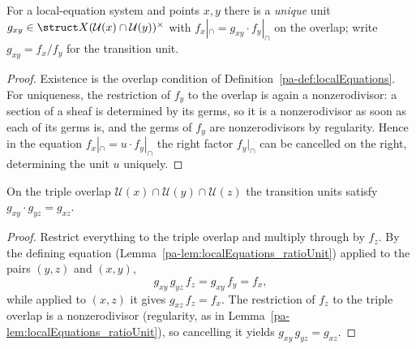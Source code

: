 \begin{lemma}
  \label{pa-lem:localEquations_ratioUnit}
  \leanok

  For a local-equation system and points \(x, y\) there is a \emph{unique} unit \(g_{xy} \in
  \struct X(\mathcal U(x) \cap \mathcal U(y))^{\times}\) with \(f_x|_{\cap} = g_{xy} \cdot
  f_y|_{\cap}\) on the overlap; write \(g_{xy} = f_x/f_y\) for the transition unit.
\end{lemma}
\begin{proof}
  \leanok
  Existence is the overlap condition of Definition~\ref{pa-def:localEquations}. For uniqueness, the
  restriction of \(f_y\) to the overlap is again a nonzerodivisor: a section of a sheaf is
  determined by its germs, so it is a nonzerodivisor as soon as each of its germs is, and the germs
  of \(f_y\) are nonzerodivisors by regularity. Hence in the equation \(f_x|_{\cap} = u \cdot
  f_y|_{\cap}\) the right factor \(f_y|_{\cap}\) can be cancelled on the right, determining the unit
  \(u\) uniquely.
\end{proof}

\begin{lemma}
  \label{pa-lem:localEquations_cocycle}
  \leanok

  On the triple overlap \(\mathcal U(x) \cap \mathcal U(y) \cap \mathcal U(z)\) the transition
  units satisfy \(g_{xy} \cdot g_{yz} = g_{xz}\).
\end{lemma}
\begin{proof}
  \leanok
  Restrict everything to the triple overlap and multiply through by \(f_z\). By the defining
  equation (Lemma~\ref{pa-lem:localEquations_ratioUnit}) applied to the pairs \((y,z)\) and \((x,y)\),
  \[
    g_{xy}\, g_{yz}\, f_z = g_{xy}\, f_y = f_x ,
  \]
  while applied to \((x,z)\) it gives \(g_{xz}\, f_z = f_x\). The restriction of \(f_z\) to the
  triple overlap is a nonzerodivisor (regularity, as in
  Lemma~\ref{pa-lem:localEquations_ratioUnit}), so cancelling it yields \(g_{xy}\, g_{yz} = g_{xz}\).
\end{proof}

